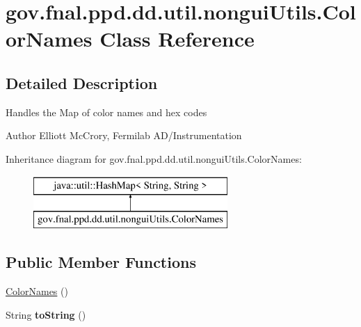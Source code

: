 \hypertarget{classgov_1_1fnal_1_1ppd_1_1dd_1_1util_1_1nonguiUtils_1_1ColorNames}{\section{gov.\-fnal.\-ppd.\-dd.\-util.\-nongui\-Utils.\-Color\-Names Class Reference}
\label{classgov_1_1fnal_1_1ppd_1_1dd_1_1util_1_1nonguiUtils_1_1ColorNames}
}


\subsection{Detailed Description}
Handles the Map of color names and hex codes

\begin{DoxyAuthor}{Author}
Elliott Mc\-Crory, Fermilab A\-D/\-Instrumentation 
\end{DoxyAuthor}
Inheritance diagram for gov.\-fnal.\-ppd.\-dd.\-util.\-nongui\-Utils.\-Color\-Names\-:\begin{figure}[H]
\begin{center}
\leavevmode
\includegraphics[height=2.000000cm]{classgov_1_1fnal_1_1ppd_1_1dd_1_1util_1_1nonguiUtils_1_1ColorNames}
\end{center}
\end{figure}
\subsection*{Public Member Functions}
\begin{DoxyCompactItemize}
\item 
\hyperlink{classgov_1_1fnal_1_1ppd_1_1dd_1_1util_1_1nonguiUtils_1_1ColorNames_a33e7e1d6596187e15f63db7c3f07b391}{Color\-Names} ()
\item 
\hypertarget{classgov_1_1fnal_1_1ppd_1_1dd_1_1util_1_1nonguiUtils_1_1ColorNames_ab2ef68816f5dfde5d491fd4dd35f4f5f}{String {\bfseries to\-String} ()}\label{classgov_1_1fnal_1_1ppd_1_1dd_1_1util_1_1nonguiUtils_1_1ColorNames_ab2ef68816f5dfde5d491fd4dd35f4f5f}

\end{DoxyCompactItemize}


